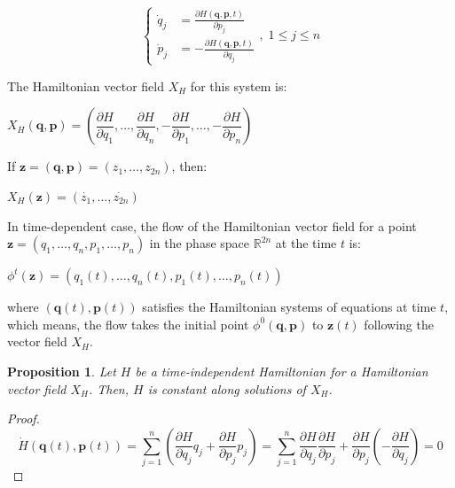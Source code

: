 \documentclass[a4paper,12pt] {article}
\newtheorem{proposition}{Proposition}[section]
\begin{document}
\[
\left\{
\begin{aligned}
\dot{q}_j &= \frac{\partial H(\mathbf{q},\mathbf{p},t)}{\partial p_j}\\[2mm]
\dot{p}_j &= -\frac{\partial H(\mathbf{q},\mathbf{p},t)}{\partial q_j}
\end{aligned}
\right., \; 1 \le j \le n
\]

 The Hamiltonian vector field $X_H$ for this system is:

\begin{center}
    $X_H(\mathbf{q},\mathbf{p}) = \left(\dfrac{\partial H}{\partial q_1},\dots,\dfrac{\partial H}{\partial q_n},-\dfrac{\partial H}{\partial p_1},\dots,-\dfrac{\partial H}{\partial p_n}\right)$
\end{center}

 If $\mathbf{z} = (\mathbf{q},\mathbf{p}) = (z_1,\dots,z_{2n})$, then:

\begin{center}
    $X_H(\mathbf{z}) = (\dot{z_1},\dots,\dot{z_{2n}})$
\end{center}

 In time-dependent case, the flow of the Hamiltonian vector field for a point $\mathbf{z} = (q_1,\dots,q_n,p_1,\dots,p_n)$ in the phase space $\mathbb{R}^{2n}$ at the time $t$ is:

\begin{center}
    $\phi^t(\mathbf{z}) = (q_1(t),\dots,q_n(t),p_1(t),\dots,p_n(t))$
\end{center}

\noindent where $(\mathbf{q}(t),\mathbf{p}(t))$ satisfies the Hamiltonian systems of equations at time $t$, which means, the flow takes the initial point $\phi^0(\mathbf{q},\mathbf{p})$ to $\mathbf{z}(t)$ following the vector field  $X_H$.

\begin{proposition}
    Let $H$ be a time-independent Hamiltonian for a Hamiltonian vector field $X_H$. Then, $H$ is constant along solutions of $X_H$.
\end{proposition}

\begin{proof}
\[
\dot{H}(\mathbf{q}(t),\mathbf{p}(t)) = \displaystyle \sum_{j=1}^n \left(\dfrac{\partial H}{\partial q_j}q_j + \dfrac{\partial H}{\partial p_j}p_j\right) = \displaystyle \sum_{j=1}^n \dfrac{\partial H}{\partial q_j}\dfrac{\partial H}{\partial p_j} + \dfrac{\partial H}{\partial p_j}\left(-\dfrac{\partial H}{\partial q_j}\right) = 0
\]
\end{proof}
\end{document}
